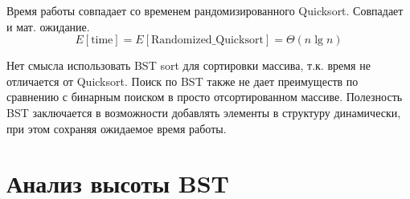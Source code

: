 \documentclass[11pt]{article}
\begin{document}
Время работы совпадает со временем рандомизированного Quicksort. Совпадает и мат. ожидание.
\begin{equation*}
  E[\text{time}] = E[\text{Randomized\_Quicksort}] = \Theta(n \lg n)
\end{equation*}

Нет смысла использовать BST sort для сортировки массива, т.к. время не отличается от Quicksort. Поиск по BST также не дает преимуществ по сравнению с бинарным поиском в просто отсортированном массиве. Полезность BST заключается в возможности добавлять элементы в структуру динамически, при этом сохраняя ожидаемое время работы.

\section{Анализ высоты BST}
\end{document}
